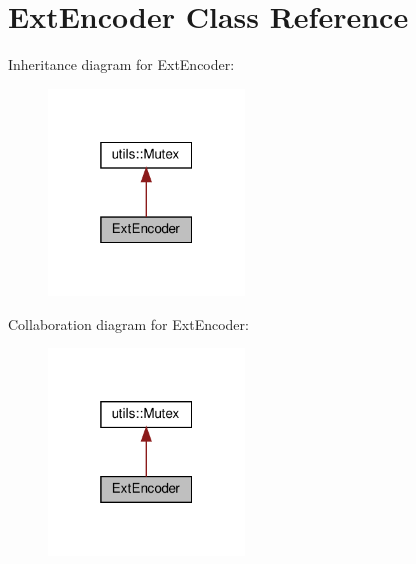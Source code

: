 \hypertarget{classExtEncoder}{}\section{Ext\+Encoder Class Reference}
\label{classExtEncoder}


Inheritance diagram for Ext\+Encoder\+:
\nopagebreak
\begin{figure}[H]
\begin{center}
\leavevmode
\includegraphics[width=148pt]{classExtEncoder__inherit__graph}
\end{center}
\end{figure}


Collaboration diagram for Ext\+Encoder\+:
\nopagebreak
\begin{figure}[H]
\begin{center}
\leavevmode
\includegraphics[width=148pt]{classExtEncoder__coll__graph}
\end{center}
\end{figure}
